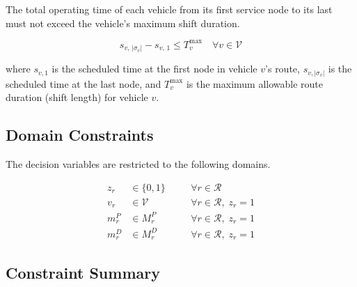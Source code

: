 The total operating time of each vehicle from its first service node to its last must not
exceed the vehicle's maximum shift duration.

\begin{equation}\label{con:route-duration}
  s_{v,\, |\sigma_v|} - s_{v,\, 1} \leq T_v^{\max} \quad \forall v \in \mathcal{V}
\end{equation}

where $s_{v, 1}$ is the scheduled time at the first node in vehicle $v$'s route,
$s_{v, |\sigma_v|}$ is the scheduled time at the last node, and $T_v^{\max}$ is the maximum
allowable route duration (shift length) for vehicle $v$.

\subsection*{Domain Constraints}

The decision variables are restricted to the following domains.

\begin{align}
  z_r &\in \{0,1\} \quad &&\forall r \in \mathcal{R} \label{con:binary-z}\\
  v_r &\in \mathcal{V} \quad &&\forall r \in \mathcal{R},\; z_r = 1 \label{con:domain-v}\\
  m_r^P &\in M_r^P \quad &&\forall r \in \mathcal{R},\; z_r = 1 \label{con:domain-mp}\\
  m_r^D &\in M_r^D \quad &&\forall r \in \mathcal{R},\; z_r = 1 \label{con:domain-md}
\end{align}

\subsection*{Constraint Summary}

